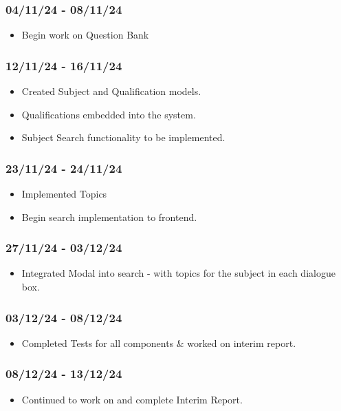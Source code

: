 \documentclass[]{final_report}
\begin{document}
\subsubsection*{04/11/24 - 08/11/24}
\begin{itemize}
    \item Begin work on Question Bank
\end{itemize}

\subsubsection*{12/11/24 - 16/11/24}
\begin{itemize}
    \item Created Subject and Qualification models. 
    \item Qualifications embedded into the system. 
    \item Subject Search functionality to be implemented.
\end{itemize}

\subsubsection*{23/11/24 - 24/11/24}
\begin{itemize}
    \item Implemented Topics
    \item Begin search implementation to frontend.
\end{itemize}

\subsubsection*{27/11/24 - 03/12/24}
\begin{itemize}
    \item Integrated Modal into search - with topics for the subject in each dialogue box.
\end{itemize}

\subsubsection*{03/12/24 - 08/12/24}
\begin{itemize}
    \item Completed Tests for all components \& worked on interim report.
\end{itemize}

\subsubsection*{08/12/24 - 13/12/24}
\begin{itemize}
    \item Continued to work on and complete Interim Report.
\end{itemize}
\end{document}

